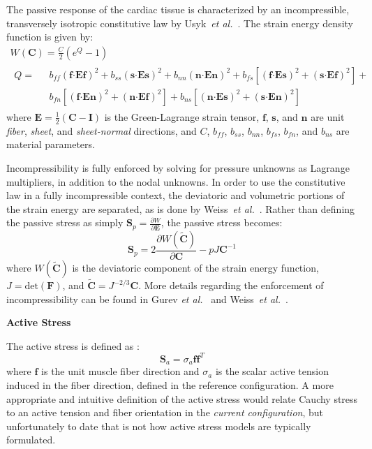 The passive response of the cardiac tissue is characterized by an incompressible, transversely isotropic constitutive law by Usyk~\textit{et al.}~\cite{usyk_2002}. The strain energy density function is given by:
\begin{gather}
W(\bm{C}) = \frac{C}{2}\left(e^Q -1\right) \\
\begin{aligned}
Q =\text{\ } &b_{ff} \left(\bm{f}\bm{\cdot}\bm{E}\bm{f}\right)^2 + b_{ss} \left(\bm{s}\bm{\cdot}\bm{E}\bm{s}\right)^2 + b_{nn} \left(\bm{n}\bm{\cdot}\bm{E}\bm{n}\right)^2 + b_{fs}\left[\left(\bm{f}\bm{\cdot}\bm{E}\bm{s}\right)^2 + \left(\bm{s}\bm{\cdot}\bm{E}\bm{f}\right)^2\right] +\\
& b_{fn}\left[\left(\bm{f}\bm{\cdot}\bm{E}\bm{n}\right)^2 + \left(\bm{n}\bm{\cdot}\bm{E}\bm{f}\right)^2\right] + b_{ns}\left[\left(\bm{n}\bm{\cdot}\bm{E}\bm{s}\right)^2 + \left(\bm{s}\bm{\cdot}\bm{E}\bm{n}\right)^2\right]
\end{aligned}
\label{eqn:usyk}
\end{gather}
where $\bm{E} = \frac{1}{2}(\bm{C} - \bm{I})$ is the Green-Lagrange strain tensor, $\bm{f}$, $\bm{s}$, and $\bm{n}$ are unit \textit{fiber}, \textit{sheet}, and \textit{sheet-normal} directions, and $C$, $b_{ff}$, $b_{ss}$, $b_{nn}$, $b_{fs}$, $b_{fn}$, and $b_{ns}$ are material parameters.

Incompressibility is fully enforced by solving for pressure unknowns as Lagrange multipliers, in addition to the nodal unknowns. In order to use the constitutive law in a fully incompressible context, the deviatoric and volumetric portions of the strain energy are separated, as is done by Weiss~\textit{et al.}~\cite{weiss_1996}. Rather than defining the passive stress as simply $\bm{S}_p = \frac{\partial W}{\partial \bm{E}}$, the passive stress becomes:
\begin{equation}
\bm{S}_p= 2\frac{\partial{{W}(\tilde{\bm{C}})}}{\partial{\bm{C}}} - pJ\bm{C}^{-1}
\end{equation}
where ${W}(\tilde{\bm{C}})$ is the deviatoric component of the strain energy function, $J = \text{det}(\bm{F})$, and $\tilde{\bm{C}} = J^{-2/3}\bm{C}$. More details regarding the enforcement of incompressibility can be found in Gurev \textit{et al.}~\cite{gurev_2015} and Weiss~\textit{et al.}~\cite{weiss_1996}.

\textbf{Active Stress}

The active stress is defined as :
\begin{equation}
\bm{S}_a = \sigma_a \bm{f} \bm{f}^{T}
\label{eqn:active}
\end{equation}
where $\bm{f}$ is the unit muscle fiber direction and ${\sigma_a}$ is the scalar active tension induced in the fiber direction, defined in the reference configuration. A more appropriate and intuitive definition of the active stress would relate Cauchy stress to an active tension and fiber orientation in the \textit{current configuration}, but unfortunately to date that is not how active stress models are typically formulated.

